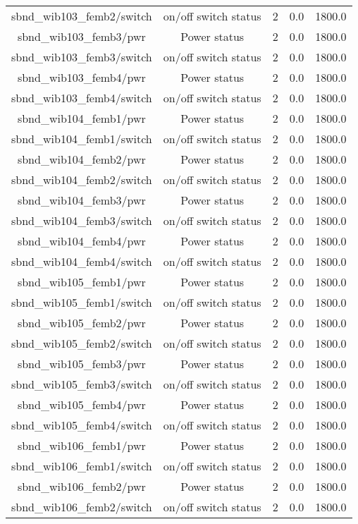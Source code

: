 \begin{table}[ptb]
\begin{tabular}{c | c c c c}
sbnd_wib103_femb2/switch & on/off switch status & 2 & 0.0 & 1800.0\\ 
sbnd_wib103_femb3/pwr & Power status & 2 & 0.0 & 1800.0\\ 
sbnd_wib103_femb3/switch & on/off switch status & 2 & 0.0 & 1800.0\\ 
sbnd_wib103_femb4/pwr & Power status & 2 & 0.0 & 1800.0\\ 
sbnd_wib103_femb4/switch & on/off switch status & 2 & 0.0 & 1800.0\\ 
sbnd_wib104_femb1/pwr & Power status & 2 & 0.0 & 1800.0\\ 
sbnd_wib104_femb1/switch & on/off switch status & 2 & 0.0 & 1800.0\\ 
sbnd_wib104_femb2/pwr & Power status & 2 & 0.0 & 1800.0\\ 
sbnd_wib104_femb2/switch & on/off switch status & 2 & 0.0 & 1800.0\\ 
sbnd_wib104_femb3/pwr & Power status & 2 & 0.0 & 1800.0\\ 
sbnd_wib104_femb3/switch & on/off switch status & 2 & 0.0 & 1800.0\\ 
sbnd_wib104_femb4/pwr & Power status & 2 & 0.0 & 1800.0\\ 
sbnd_wib104_femb4/switch & on/off switch status & 2 & 0.0 & 1800.0\\ 
sbnd_wib105_femb1/pwr & Power status & 2 & 0.0 & 1800.0\\ 
sbnd_wib105_femb1/switch & on/off switch status & 2 & 0.0 & 1800.0\\ 
sbnd_wib105_femb2/pwr & Power status & 2 & 0.0 & 1800.0\\ 
sbnd_wib105_femb2/switch & on/off switch status & 2 & 0.0 & 1800.0\\ 
sbnd_wib105_femb3/pwr & Power status & 2 & 0.0 & 1800.0\\ 
sbnd_wib105_femb3/switch & on/off switch status & 2 & 0.0 & 1800.0\\ 
sbnd_wib105_femb4/pwr & Power status & 2 & 0.0 & 1800.0\\ 
sbnd_wib105_femb4/switch & on/off switch status & 2 & 0.0 & 1800.0\\ 
sbnd_wib106_femb1/pwr & Power status & 2 & 0.0 & 1800.0\\ 
sbnd_wib106_femb1/switch & on/off switch status & 2 & 0.0 & 1800.0\\ 
sbnd_wib106_femb2/pwr & Power status & 2 & 0.0 & 1800.0\\ 
sbnd_wib106_femb2/switch & on/off switch status & 2 & 0.0 & 1800.0\\ 

\end{tabular}
\end{table}
